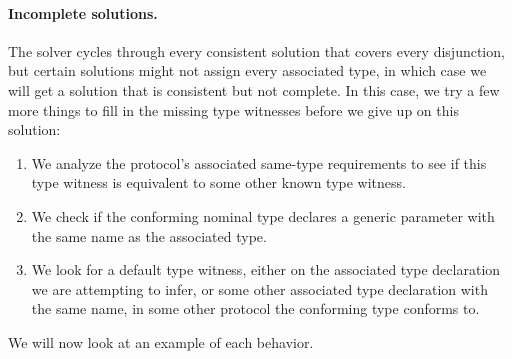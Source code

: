 \documentclass[../generics]{subfiles}
\begin{document}
\paragraph{Incomplete solutions.} The solver cycles through every consistent solution that covers every disjunction, but certain solutions might not assign every associated type, in which case we will get a solution that is consistent but not complete. In this case, we try a few more things to fill in the missing type witnesses before we give up on this solution:
\begin{enumerate}
\item We analyze the protocol's associated same-type requirements to see if this type witness is equivalent to some other known type witness.
\item We check if the conforming nominal type declares a generic parameter with the same name as the associated type.
\item We look for a default type witness, either on the associated type declaration we are attempting to infer, or some other associated type declaration with the same name, in some other protocol the conforming type conforms to.
\end{enumerate}
We will now look at an example of each behavior.
\end{document}
